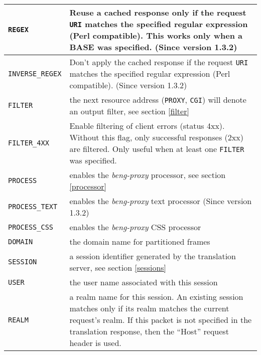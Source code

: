 \documentclass[a4paper,12pt]{article}
\begin{document}
\begin{longtable}{|l|p{8cm}|}
\verb|REGEX| & Reuse a cached response only if the request \verb|URI|
matches the specified regular expression (Perl compatible).  This
works only when a BASE was specified.
\scriptsize{(Since version 1.3.2)} \\

\hline

\verb|INVERSE_REGEX| & Don't apply the cached response if the request
\verb|URI| matches the specified regular expression (Perl
compatible). \scriptsize{(Since version 1.3.2)} \\

\hline

\verb|FILTER| & the next resource address (\verb|PROXY|,
\verb|CGI|) will denote an output filter, see section \ref{filter}
\\

\hline

\verb|FILTER_4XX| & Enable filtering of client errors (status 4xx).
Without this flag, only successful responses (2xx) are filtered.  Only
useful when at least one \verb|FILTER| was specified. \\

\hline

\verb|PROCESS| & enables the \emph{beng-proxy} processor, see
section \ref{processor} \\

\hline

\verb|PROCESS_TEXT| & enables the \emph{beng-proxy} text processor
\scriptsize{(Since version 1.3.2)} \\

\hline

\verb|PROCESS_CSS| & enables the \emph{beng-proxy} CSS processor \\

\hline

\verb|DOMAIN| & the domain name for partitioned frames \\

\hline

\verb|SESSION| & a session identifier generated by the translation
server, see section \ref{sessions} \\

\hline

\verb|USER| & the user name associated with this session \\

\hline

\verb|REALM| & a realm name for this session.  An existing session
matches only if its realm matches the current request's realm.  If
this packet is not specified in the translation response, then the
``Host'' request header is used. \\


\end{longtable}
\end{document}
